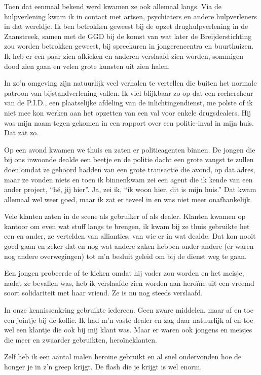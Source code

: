 \documentclass[10pt,twoside,openright]{memoir}
\begin{document}
Toen dat eenmaal bekend werd kwamen ze ook allemaal langs. Via de hulpverlening kwam ik in contact met artsen, psychiaters en andere hulpverleners in dat wereldje. Ik ben betrokken geweest bij de opzet drughulpverlening in de Zaanstreek, samen met de GGD bij de komst van wat later de Breijderstichting zou worden betrokken geweest, bij spreekuren in jongerencentra en buurthuizen. Ik heb er een paar zien afkicken en anderen verslaafd zien worden, sommigen dood zien gaan en velen grote kunsten uit zien halen. 

In zo’n omgeving zijn natuurlijk veel verhalen te vertellen die buiten het normale patroon van bijstandverlening vallen. Ik viel blijkbaar zo op dat een rechercheur van de P.I.D., een plaatselijke afdeling van de inlichtingendienst, me polste of ik niet mee kon werken aan het opzetten van een val voor enkele drugsdealers. Hij was mijn naam tegen gekomen in een rapport over een politie-inval in mijn huis. Dat zat zo. 

Op een avond kwamen we thuis en zaten er politieagenten binnen. De jongen die bij ons inwoonde dealde een beetje en de politie dacht een grote vangst te zullen doen omdat ze gehoord hadden van een grote transactie die avond, op dat adres, maar ze vonden niets en toen ik binnenkwam zei een agent die ik kende van een ander project, ``hé, jij hier''. Ja, zei ik, ``ik woon hier, dit is mijn huis.'' Dat kwam allemaal wel weer goed, maar ik zat er teveel in en was niet meer onafhankelijk. 

Vele klanten zaten in de scene als gebruiker of als dealer. Klanten kwamen op kantoor om even wat stuff langs te brengen, ik kwam bij ze thuis gebruikte het een en ander, ze vertelden van allianties, van wie er in wat dealde. Dat kon nooit goed gaan en zeker dat en nog wat andere zaken hebben onder andere (er waren nog andere overwegingen) tot m’n besluit geleid om bij de dienst weg te gaan. 

Een jongen probeerde af te kicken omdat hij vader zou worden en het meisje, nadat ze bevallen was, heb ik verslaafde zien worden aan heroïne uit een vreemd soort solidariteit met haar vriend. Ze is nu nog steeds verslaafd. 

In onze kennissenkring gebruikte iedereen. Geen zware middelen, maar af en toe een jointje bij de koffie. Ik had m’n vaste dealer en zag daar natuurlijk af en toe wel een klantje die ook bij mij klant was. Maar er waren ook jongens en meisjes die meer en zwaarder gebruikten, heroïneklanten. 

Zelf heb ik een aantal malen heroïne gebruikt en al snel ondervonden hoe de honger je in z’n greep krijgt. De flash die je krijgt is wel enorm.
\end{document}
